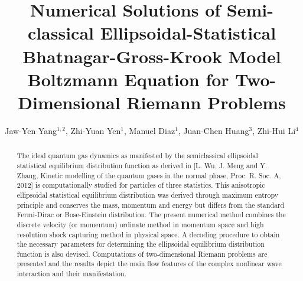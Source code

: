 \documentclass{rsproca}%
\begin{document}
\title{Numerical Solutions of Semi-classical Ellipsoidal-Statistical Bhatnagar-Gross-Krook Model Boltzmann Equation for Two-Dimensional Riemann Problems}

\author{%
Jaw-Yen Yang$^{1,2}$, Zhi-Yuan Yen$^{1}$, Manuel Diaz$^{1}$, Juan-Chen Huang$^{3}$, Zhi-Hui Li$^{4}$}

\address{$^{1}$Institute of Applied Mechanics, National Taiwan University, Taipei 10764, TAIWAN\\
$^{2}$Center of Quantum Science and Engineering, National Taiwan University, Taipei 10764, TAIWAN\\
$^{3}$Department of Merchant, National Taiwan Ocean University, Taipei 10764, TAIWAN\\
$^{4}$China Aerodynamics Research and Development Center, Mianyang, 10764, CHINA}


\subject{Mesoscopic Methods, Semi-classical Botlzmann Transport, Ellipsoidal Statistics, Kinetic Theory, Quantum shock waves}



\begin{abstract}
The ideal quantum gas dynamics as manifested by the semiclassical ellipsoidal statistical equilibrium distribution function as derived in [L. Wu, J. Meng and Y. Zhang, Kinetic modelling of the quantum gases in the normal phase, Proc. R. Soc. A, 2012] is computationally studied for particles of three statistics.  This anisotropic ellipsoidal statistical equilibrium distribution was derived through maximum entropy principle and conserves the mass, momentum and energy but differs from the standard Fermi-Dirac or Bose-Einstein distribution. The present numerical method combines the discrete velocity (or momentum) ordinate method in momentum space and high resolution shock capturing method in physical space.   A decoding procedure to obtain the necessary parameters for determining the ellipsoidal equilibrium distribution function is also devised.  Computations of two-dimensional Riemann problems are presented and the results depict the main flow features of the complex nonlinear wave interaction and their manifestation.
\end{abstract}
\end{document}
